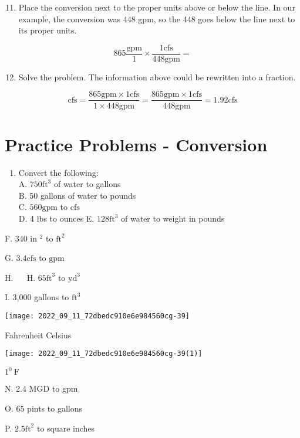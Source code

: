 \begin{enumerate}
  \setcounter{enumi}{10}
  \item Place the conversion next to the proper units above or below the line. In our example, the conversion was 448 gpm, so the 448 goes below the line next to its proper units.
\end{enumerate}
$$
865 \frac{\mathrm{gpm}}{1} \times \frac{1 \mathrm{cfs}}{448 \mathrm{gpm}}=
$$

\begin{enumerate}
  \setcounter{enumi}{11}
  \item Solve the problem. The information above could be rewritten into a fraction.
\end{enumerate}
$$
\mathrm{cfs}=\frac{865 \mathrm{gpm} \times 1 \mathrm{cfs}}{1 \times 448 \mathrm{gpm}}=\frac{865 \mathrm{gpm} \times 1 \mathrm{cfs}}{448 \mathrm{gpm}}=1.92 \mathrm{cfs}
$$

\section{Practice Problems - Conversion}
\begin{enumerate}
  \item Convert the following:\\
A. $750 \mathrm{ft}^{3}$ of water to gallons\\
B. 50 gallons of water to pounds\\
C. $560 \mathrm{gpm}$ to $\mathrm{cfs}$\\
D. 4 lbs to ounces E. $128 \mathrm{ft}^{3}$ of water to weight in pounds
\end{enumerate}
F. 340 in $^{2}$ to $\mathrm{ft}^{2}$

G. $3.4 \mathrm{cfs}$ to $\mathrm{gpm}$

H. $\quad$ H. $65 \mathrm{ft}^{3}$ to $\mathrm{yd}^{3}$

I. 3,000 gallons to $\mathrm{ft}^{3}$

\texttt{[image: 2022\_09\_11\_72dbedc910e6e984560cg-39]}

Fahrenheit Celsius

\texttt{[image: 2022\_09\_11\_72dbedc910e6e984560cg-39(1)]}

$1^{0} \mathrm{~F}$

N. 2.4 MGD to gpm

O. 65 pints to gallons

P. $2.5 \mathrm{ft}^{2}$ to square inches

